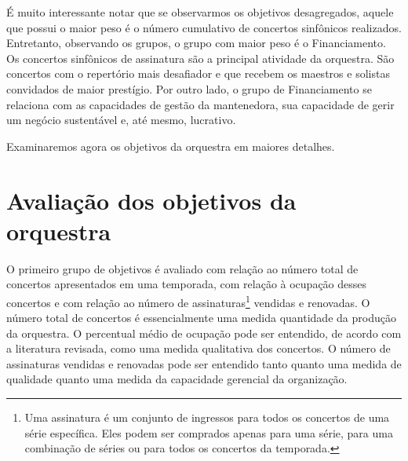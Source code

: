 \documentclass[a4paper, 12pt, openright, oneside, german, french, english, brazil]{abntex2}
\begin{document}
	É muito interessante notar que se observarmos os objetivos desagregados, aquele que possui o maior peso é o número cumulativo de concertos sinfônicos realizados. Entretanto, observando os grupos, o grupo com maior peso é o Financiamento. Os concertos sinfônicos de assinatura são a principal atividade da orquestra. São concertos com o repertório mais desafiador e que recebem os maestros e solistas convidados de maior prestígio. Por outro lado, o grupo de Financiamento se relaciona com as capacidades de gestão da mantenedora, sua capacidade de gerir um negócio sustentável e, até mesmo, lucrativo.
	
	Examinaremos agora os objetivos da orquestra em maiores detalhes.
	
	\section{Avaliação dos objetivos da orquestra}
	
	
	O primeiro grupo de objetivos é avaliado com relação ao número total de concertos apresentados em uma temporada, com relação à ocupação desses concertos e com relação ao número de assinaturas\footnote{Uma assinatura é um conjunto de ingressos para todos os concertos de uma série específica. Eles podem ser comprados apenas para uma série, para uma combinação de séries ou para todos os concertos da temporada.} vendidas e renovadas. O número total de concertos é essencialmente uma medida quantidade da produção da orquestra. O percentual médio de ocupação pode ser entendido, de acordo com a literatura revisada, como uma medida qualitativa dos concertos. O número de assinaturas vendidas e renovadas pode ser entendido tanto quanto uma medida de qualidade quanto uma medida da capacidade gerencial da organização.
	
\end{document}
